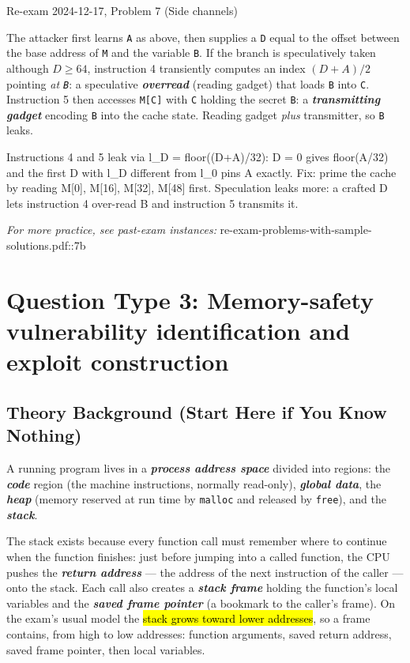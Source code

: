 \documentclass[12pt, a4paper]{article}
\newcommand{\term}[1]{\textbf{\textit{#1}}}        %
\newcommand{\imp}[1]{\hl{#1}}                       %
\begin{document}
\begin{practicebox}{Re-exam 2024-12-17, Problem 7 (Side channels)}
\begin{itemize}
    The attacker first learns \texttt{A} as above, then supplies a \texttt{D} equal to the offset between the base address of \texttt{M} and the variable \texttt{B}.
    If the branch is speculatively taken although $D \geq 64$, instruction 4 transiently computes an index $(D + A)/2$ pointing \emph{at \texttt{B}}: a speculative \term{overread} (reading gadget) that loads \texttt{B} into \texttt{C}.
    Instruction 5 then accesses \texttt{M[C]} with \texttt{C} holding the secret \texttt{B}: a \term{transmitting gadget} encoding \texttt{B} into the cache state. Reading gadget \emph{plus} transmitter, so \texttt{B} leaks.
\end{itemize}

\begin{answerbox}
Instructions 4 and 5 leak via l\_D = floor((D+A)/32): D = 0 gives floor(A/32) and the first D with l\_D different from l\_0 pins A exactly. Fix: prime the cache by reading M[0], M[16], M[32], M[48] first. Speculation leaks more: a crafted D lets instruction 4 over-read B and instruction 5 transmits it.
\end{answerbox}
\end{practicebox}

\textit{For more practice, see past-exam instances:} re-exam-problems-with-sample-solutions.pdf::7b

\section{Question Type 3: Memory-safety vulnerability identification and exploit construction}

\subsection*{Theory Background (Start Here if You Know Nothing)}

A running program lives in a \term{process address space} divided into regions: the \term{code} region (the machine instructions, normally read-only), \term{global data}, the \term{heap} (memory reserved at run time by \texttt{malloc} and released by \texttt{free}), and the \term{stack}.

The stack exists because every function call must remember where to continue when the function finishes: just before jumping into a called function, the CPU pushes the \term{return address} --- the address of the next instruction of the caller --- onto the stack.
Each call also creates a \term{stack frame} holding the function's local variables and the \term{saved frame pointer} (a bookmark to the caller's frame).
On the exam's usual model the \imp{stack grows toward lower addresses}, so a frame contains, from high to low addresses: function arguments, saved return address, saved frame pointer, then local variables.
\end{document}
